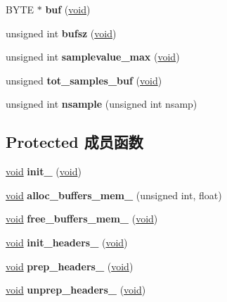 \begin{DoxyCompactItemize}
B\+Y\+TE $\ast$ {\bfseries buf} (\hyperlink{interfacevoid}{void})
\item 
\mbox{\label{classaudio__waveout_a17a61c309056fc0a488651d1ead579b2}} 
unsigned int {\bfseries bufsz} (\hyperlink{interfacevoid}{void})
\item 
\mbox{\label{classaudio__waveout_afb08fa50a5598e38a63160c81208823b}} 
unsigned int {\bfseries samplevalue\+\_\+max} (\hyperlink{interfacevoid}{void})
\item 
\mbox{\label{classaudio__waveout_a8ea4cc5d06ee54575ef2725a6b2ee15d}} 
unsigned {\bfseries tot\+\_\+samples\+\_\+buf} (\hyperlink{interfacevoid}{void})
\item 
\mbox{\label{classaudio__waveout_ac5d7c554e1e8bc789cff17d9f181469c}} 
unsigned int {\bfseries nsample} (unsigned int nsamp)
\end{DoxyCompactItemize}
\subsection*{Protected 成员函数}
\begin{DoxyCompactItemize}
\item 
\mbox{\label{classaudio__waveout_a40d0faed89448a38af571133baadebdb}} 
\hyperlink{interfacevoid}{void} {\bfseries init\+\_\+} (\hyperlink{interfacevoid}{void})
\item 
\mbox{\label{classaudio__waveout_a57d9385ad242e5ae9fbe0eac96092f29}} 
\hyperlink{interfacevoid}{void} {\bfseries alloc\+\_\+buffers\+\_\+mem\+\_\+} (unsigned int, float)
\item 
\mbox{\label{classaudio__waveout_aacc9504113c0457299d79d7b554bdba6}} 
\hyperlink{interfacevoid}{void} {\bfseries free\+\_\+buffers\+\_\+mem\+\_\+} (\hyperlink{interfacevoid}{void})
\item 
\mbox{\label{classaudio__waveout_a4c3a5cbd9d9c744ddee161b0c017a715}} 
\hyperlink{interfacevoid}{void} {\bfseries init\+\_\+headers\+\_\+} (\hyperlink{interfacevoid}{void})
\item 
\mbox{\label{classaudio__waveout_a8175b22da619671f693248f64bfc505d}} 
\hyperlink{interfacevoid}{void} {\bfseries prep\+\_\+headers\+\_\+} (\hyperlink{interfacevoid}{void})
\item 
\mbox{\label{classaudio__waveout_a75cfca2a5b277b7fc3cfb2b2b5564e21}} 
\hyperlink{interfacevoid}{void} {\bfseries unprep\+\_\+headers\+\_\+} (\hyperlink{interfacevoid}{void})
\end{DoxyCompactItemize}
